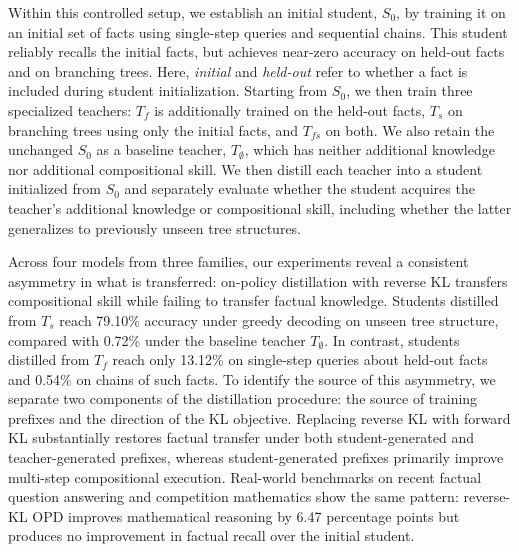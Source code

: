 \documentclass[]{template}
\theoremstyle{plain}
\theoremstyle{definition}
\theoremstyle{remark}
\begin{document}
Within this controlled setup, we establish an initial student, $S_0$, by training it on an initial set of facts using single-step queries and sequential chains. This student reliably recalls the initial facts, but achieves near-zero accuracy on held-out facts and on branching trees. Here, \emph{initial} and \emph{held-out} refer to whether a fact is included during student initialization. 
Starting from \(S_0\), we then train three specialized teachers: \(T_f\) is additionally trained on the held-out facts, \(T_s\) on branching trees using only the initial facts, and \(T_{fs}\) on both. We also retain the unchanged \(S_0\) as a baseline teacher, \(T_{\emptyset}\), which has neither additional knowledge nor additional compositional skill. We then distill each teacher into a student initialized from \(S_0\) and separately evaluate whether the student acquires the teacher’s additional knowledge or compositional skill, including whether the latter generalizes to previously unseen tree structures.

Across four models from three families, our experiments reveal a consistent asymmetry in what is transferred: on-policy distillation with reverse KL transfers compositional skill while failing to transfer factual knowledge. Students distilled from $T_s$ reach 79.10\% accuracy under greedy decoding on unseen tree structure, compared with 0.72\% under the baseline teacher \(T_{\emptyset}\). In contrast, students distilled from $T_f$ reach only 13.12\% on single-step queries about held-out facts and 0.54\% on chains of such facts. To identify the source of this asymmetry, we separate two components of the distillation procedure: the source of training prefixes and the direction of the KL objective. Replacing reverse KL with forward KL substantially restores factual transfer under both student-generated and teacher-generated prefixes, whereas student-generated prefixes primarily improve multi-step compositional execution.
Real-world benchmarks on recent factual question answering and competition mathematics show the same pattern: reverse-KL OPD improves mathematical reasoning by 6.47 percentage points but produces no improvement in factual recall over the initial student.

\end{document}
